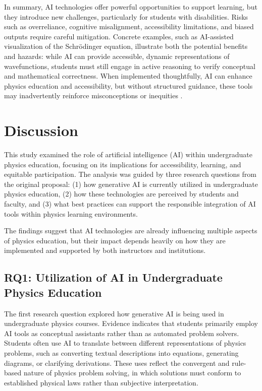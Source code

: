 \documentclass[]{aastex701}
\begin{document}
In summary, AI technologies offer powerful opportunities to support learning, but they introduce new challenges, particularly for students with disabilities. Risks such as overreliance, cognitive misalignment, accessibility limitations, and biased outputs require careful mitigation. Concrete examples, such as AI-assisted visualization of the Schr\"{o}dinger equation, illustrate both the potential benefits and hazards: while AI can provide accessible, dynamic representations of wavefunctions, students must still engage in active reasoning to verify conceptual and mathematical correctness. When implemented thoughtfully, AI can enhance physics education and accessibility, but without structured guidance, these tools may inadvertently reinforce misconceptions or inequities \citep{Paglialunga2025, Voultsiou2025, Khowaja2025, Weijers2025, Singh2001}.


\section{Discussion}

This study examined the role of artificial intelligence (AI) within undergraduate physics education, focusing on its implications for accessibility, learning, and equitable participation. The analysis was guided by three research questions from the original proposal: (1) how generative AI is currently utilized in undergraduate physics education, (2) how these technologies are perceived by students and faculty, and (3) what best practices can support the responsible integration of AI tools within physics learning environments.

The findings suggest that AI technologies are already influencing multiple aspects of physics education, but their impact depends heavily on how they are implemented and supported by both instructors and institutions.


\subsection{RQ1: Utilization of AI in Undergraduate Physics Education}

The first research question explored how generative AI is being used in undergraduate physics courses. Evidence indicates that students primarily employ AI tools as conceptual assistants rather than as automated problem solvers. Students often use AI to translate between different representations of physics problems, such as converting textual descriptions into equations, generating diagrams, or clarifying derivations. These uses reflect the convergent and rule-based nature of physics problem solving, in which solutions must conform to established physical laws rather than subjective interpretation.
\end{document}
